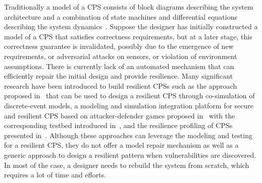 %
Traditionally a model of a CPS consists of block diagrams describing the system architecture and a combination of state machines and differential equations describing the system dynamics~\cite{alur1995algorithmic}. Suppose the designer has initially constructed a model of a CPS that satisfies correctness requirements, but at a later stage, this correctness guarantee is invalidated, possibly due to the emergence of new requirements, or adversarial attacks on sensors, or violation of environment assumptions. There is currently lack of an automated mechanism that can efficiently repair the initial design and provide resilience.  
%
%
Many significant research have been introduced to build resilient CPSs such as the approach proposed in~\cite{fitzgerald2012rigorous} that can be used to design a resilient CPS through co-simulation of discrete-event models, a modeling and simulation integration platform for secure and resilient CPS based on attacker-defender games proposed in~\cite{koutsoukos2018sure} with the corresponding testbed introduced in~\cite{neema2018integrated}, and the resilience profiling of CPSs presented in~\cite{jackson28resilience}. Although these approaches can leverage the modeling and testing for a resilient CPS, they do not offer a model repair mechanism as well as a generic approach to design a resilient pattern when vulnerabilities are discovered. In most of the case, a designer needs to rebuild the system from scratch, which requires a lot of time and efforts. 
%
%
%
%
%

%
%

